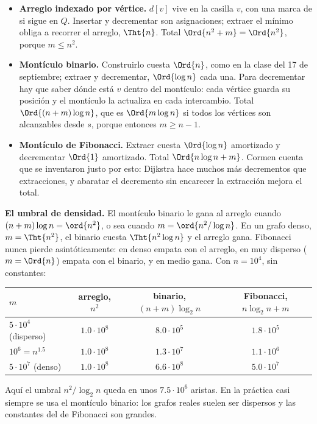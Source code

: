 \documentclass[11pt,letterpaper]{article}
\begin{document}
\begin{itemize}[itemsep=0.1em]
  \item \textbf{Arreglo indexado por vértice.} $d[v]$ vive en la
        casilla $v$, con una marca de si sigue en $Q$. Insertar y
        decrementar son asignaciones; extraer el mínimo obliga a
        recorrer el arreglo, $\Tht{n}$. Total $\Ord{n^2 + m}
        = \Ord{n^2}$, porque $m \le n^2$.
  \item \textbf{Montículo binario.} Construirlo cuesta $\Ord{n}$, como
        en la clase del 17 de septiembre; extraer y decrementar,
        $\Ord{\log n}$ cada una. Para decrementar hay que saber dónde
        está $v$ dentro del montículo: cada vértice guarda su
        posición y el montículo la actualiza en cada intercambio.
        Total $\Ord{(n + m) \log n}$, que es $\Ord{m \log n}$ si todos
        los vértices son alcanzables desde $s$, porque entonces
        $m \ge n - 1$.
  \item \textbf{Montículo de Fibonacci.} Extraer cuesta $\Ord{\log n}$
        amortizado y decrementar $\Ord{1}$ amortizado. Total
        $\Ord{n \log n + m}$. Cormen cuenta que se inventaron justo
        por esto: Dijkstra hace muchos más decrementos que
        extracciones, y abaratar el decremento sin encarecer la
        extracción mejora el total.
\end{itemize}

\textbf{El umbral de densidad.} El montículo binario le gana al
arreglo cuando $(n + m)\log n = \ord{n^2}$, o sea cuando
$m = \ord{n^2 / \log n}$. En un grafo denso, $m = \Tht{n^2}$, el
binario cuesta $\Tht{n^2 \log n}$ y el arreglo gana. Fibonacci nunca
pierde asintóticamente: en denso empata con el arreglo, en muy
disperso ($m = \Ord{n}$) empata con el binario, y en medio gana. Con
$n = 10^4$, sin constantes:
\begin{center}
\small
\begin{tabular}{lccc}
  \toprule
  $m$ & arreglo, $n^2$ & binario, $(n + m)\log_2 n$
    & Fibonacci, $n \log_2 n + m$ \\
  \midrule
  $5 \cdot 10^4$ (disperso) & $1.0 \cdot 10^8$ & $8.0 \cdot 10^5$
    & $1.8 \cdot 10^5$ \\
  $10^6 = n^{1.5}$ & $1.0 \cdot 10^8$ & $1.3 \cdot 10^7$
    & $1.1 \cdot 10^6$ \\
  $5 \cdot 10^7$ (denso) & $1.0 \cdot 10^8$ & $6.6 \cdot 10^8$
    & $5.0 \cdot 10^7$ \\
  \bottomrule
\end{tabular}
\end{center}
Aquí el umbral $n^2 / \log_2 n$ queda en unos $7.5 \cdot 10^6$
aristas. En la práctica casi siempre se usa el montículo binario: los
grafos reales suelen ser dispersos y las constantes del de Fibonacci
son grandes.
\end{document}
